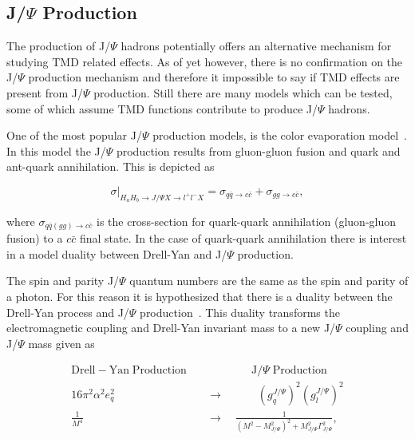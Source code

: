 \subsection{J/$\Psi$ Production}\label{sec::theory_jpsi}
The production of J/$\Psi$ hadrons potentially offers an alternative mechanism
for studying TMD related effects.  As of yet however, there is no confirmation
on the J/$\Psi$ production mechanism and therefore it impossible to say if TMD
effects are present from J/$\Psi$ production.  Still there are many models which
can be tested, some of which assume TMD functions contribute to produce J/$\Psi$
hadrons.

One of the most popular J/$\Psi$ production models, is the color evaporation
model~\cite{VOGT1999197}.  In this model the J/$\Psi$ production results from
gluon-gluon fusion and quark and ant-quark annihilation.  This is depicted as

\begin{equation}
  \sigma \Big |_{H_aH_b\rightarrow J/\Psi X \rightarrow l^+l^- X}
  = \sigma_{q\bar{q}\rightarrow c\bar{c}} + \sigma_{gg\rightarrow c\bar{c}},
\end{equation}

\noindent
where $\sigma_{q\bar{q}(gg)\rightarrow c\bar{c}}$ is the cross-section for
quark-quark annihilation (gluon-gluon fusion) to a $c\bar{c}$ final state.  In
the case of quark-quark annihilation there is interest in a model duality
between Drell-Yan and J/$\Psi$ production.

The spin and parity J/$\Psi$ quantum numbers are the same as the spin and parity
of a photon.  For this reason it is hypothesized that there is a duality between
the Drell-Yan process and J/$\Psi$
production~\cite{Anselmino:2004ki,Barone2007,Sissakian:2008th}.  This duality
transforms the electromagnetic coupling and Drell-Yan invariant mass to a new
J/$\Psi$ coupling and J/$\Psi$ mass given as

\begin{align}
  \nonumber
  \mathrm{Drell-}\mathrm{Yan}\; \mathrm{Production} \quad &
  \quad\quad\quad\quad \mathrm{J/}\Psi \;\mathrm{Production}
  \\
  \label{equ::dualityJPsi_coupling}
  16\pi^2\alpha^2e_q^2 \quad &\rightarrow
  \quad \quad\quad (g_q^{J/\Psi})^2(g_l^{J/\Psi})^2
  \\
  \label{equ::dualityJPsi_mass}
  \frac{1}{M^4} \quad \quad &\rightarrow \quad
  \frac{1}{(M^2-M^2_{J/\Psi})^2 + M^2_{J/\Psi}\Gamma^2_{J/\Psi}},
\end{align}

